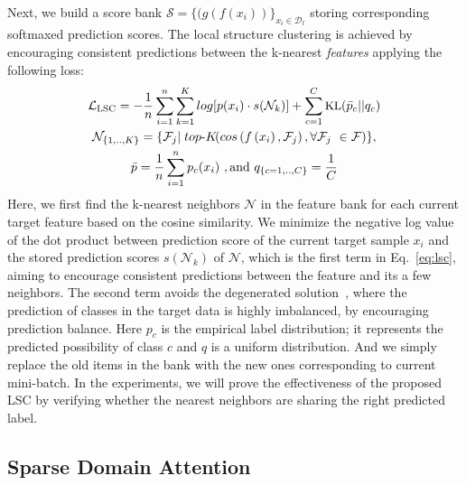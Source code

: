 \documentclass[10pt,twocolumn,letterpaper]{article}
\begin{document}
Next, we build
a score bank $\mathcal{S}=\{(g(f(x_i))\}_{x_i \in \mathcal{D}_t}$ storing corresponding softmaxed prediction scores. The local structure clustering is achieved by encouraging consistent predictions between the k-nearest \textit{features} applying the following loss:
\begin{equation}\label{eq:lsc}
\begin{gathered}
\small
\mathcal{L}_{\mathrm{LSC}}=-\frac{1}{n} \sum_{i=1}^{n}\sum_{k=1}^{K}  log[  p(x_i) \cdot s(\mathcal{N}_k)]+\sum_{c=1}^{C} \textrm{KL}(\bar{p}_c||q_c)
\\
\mathcal{N}_{\{1,..,K\}}=\{\mathcal{F}_j | \;top\textrm{-}K\!\! \left(cos\left(f\left(x_i\right),\mathcal{F}_j\right),  \forall \mathcal{F}_j\ \in \mathcal{F}\right) \},\\
 \bar{p}=\frac{1}{n}\sum_{i=1}^n p_{c}(x_i) \ ,\textrm{and}\  q_{\{c=1,..,C\}}= \frac{1}{C} \end{gathered}
\end{equation}
Here, we first find the k-nearest neighbors $\mathcal{N}$ in the feature bank for each current target feature based on the cosine similarity.
We minimize the negative log value of the dot product between prediction score of the current target sample $x_i$ and the stored prediction scores $s(\mathcal{N}_k)$ of $\mathcal{N}$, which is the first term in Eq.~\ref{eq:lsc}, aiming to encourage consistent predictions between the feature and its a few neighbors. The second term avoids the degenerated solution~\cite{shi2012information,ghasedi2017deep}, where the prediction of classes in the target data is highly imbalanced, by encouraging prediction balance. Here $p_c$ is the empirical label distribution; it represents the predicted possibility of class $c$ and $q$ is a uniform distribution. And we simply replace the old items in the bank with the new ones corresponding to current mini-batch. In the experiments, we will prove the effectiveness of the proposed LSC by verifying whether the nearest neighbors are sharing the right predicted label.






\subsection{Sparse Domain Attention}
\end{document}

